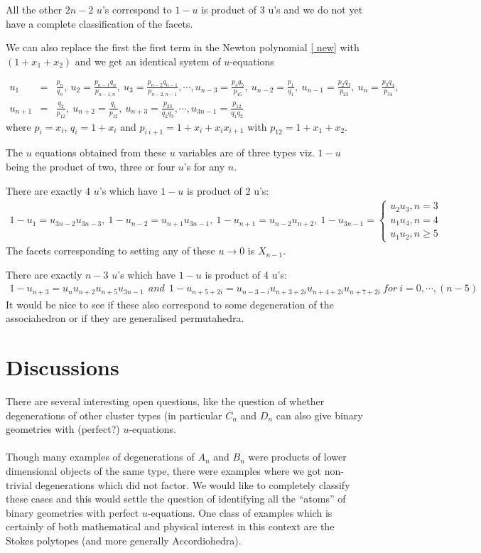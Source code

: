 \documentclass[hidelinks,12pt]{article}
\newcommand{\bea}[1]{\begin{eqnarray}\label{#1} }
\newcommand{\eea}{\end{eqnarray}}
\def\bea{\begin{eqnarray}}
\def\eea{\end{eqnarray}}
\begin{document}
All the other $2n-2$ $u$'s correspond to $1-u$ is product of 3 u's and we do not yet have a complete classification of the facets.

We can also replace the first the first term in the Newton polynomial \eqref{ new} with $(1+x_1+ x_2)$ and we get an identical system of $u$-equations

\bea
u_1 &=& \frac{p_n}{q_n}, ~u_2 = \frac{p_{n-1}q_n}{p_{n-1,n}},~u_3 = \frac{p_{n-2}q_{n-1}}{p_{n-2,n-1}}, \cdots,
u_{n-3} = \frac{p_4 q_5}{p_{45}}, ~u_{n-2} = \frac{p_{1}}{q_{1}},~u_{n-1} = \frac{p_{2}q_{3}}{p_{23}},~u_{n} = \frac{p_{3}q_{4}}{p_{34}}, \nonumber \\
u_{n+1} &=& \frac{q_2}{p_{12}}, ~u_{n+2} = \frac{q_{1}}{p_{12}},~u_{n+3} = \frac{p_{23}}{q_{2}q_{3}}, \cdots,
u_{3n-1} = \frac{ p_{12}}{q_{1}q_{2}} \nonumber
\eea
where $p_i =x_i$, $q_i= 1+x_i$ and $p_{i~i+1}=1+x_i+ x_i x_{i+1}$ with $p_{12}= 1+x_1+x_2$.

The $u$ equations obtained from these $u$ variables are of three types viz. $1-u$ being the product of two, three or four $u$'s  for any $n$.  

There are exactly 4 $u$'s which have $1-u$ is product of 2 u's:
\bea
1-u_{1} =u_{3n-2} u_{3n-3},~
1-u_{n-2} =u_{n+1} u_{3n-1},~
1-u_{n+1} =u_{n-2} u_{n+2},~
1-u_{3n-1} = \begin{cases}
u_{2} u_{3} , n=3\\
u_{1} u_{4} , n=4\\
u_{1} u_{2} , n\geq 5
\end{cases} \nonumber 
\eea
The facets corresponding to setting any of these $u \to 0$ is $X_{n-1}$.

There are exactly $n-3$ $u$'s which have $1-u$ is product of 4 u's:
\bea
1-u_{n+3} =u_{n} u_{n+2}u_{n+5} u_{3n-1} ~~and~~
1-u_{n+5+ 2 i} =u_{n-3-i} u_{n+3+2 i} u_{n+4+2 i} u_{n+7+2 i}~ for~i=0,\cdots,(n-5) \nonumber 
\eea
It would be nice to see if these also correspond to some degeneration of the associahedron or if they  are generalised permutahedra. 
\newpage
\section{Discussions}
There are several interesting open questions, like the question of  whether degenerations of other cluster types (in particular $C_n$ and $D_n$ can also give binary geometries with (perfect?) $u$-equations.\\\\
\noindent
Though many examples of degenerations of $A_n$ and $B_n$ were products of lower dimensional objects of the same type, there were examples where we got non-trivial degenerations which did not factor. We would like to completely classify these cases and this would settle the question of identifying all the ``atoms'' of binary geometries with perfect $u$-equations. One class of examples which is certainly of both mathematical and physical interest in this context are the Stokes polytopes (and more generally Accordiohedra).


\end{document}
